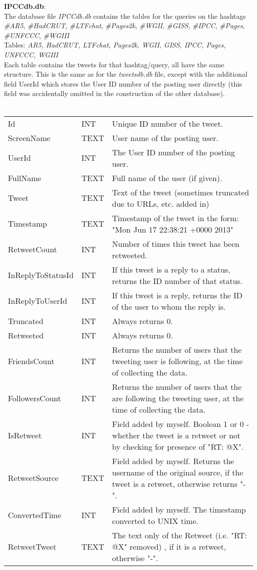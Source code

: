 \documentclass[paper=a4, fontsize=11pt]{scrartcl}
\numberwithin{equation}{section}		%
\numberwithin{figure}{section}			%
\numberwithin{table}{section}				%
\begin{document}
{\bf IPCCdb.db}:\\

The database file \emph{IPCCdb.db} contains the tables for the queries on the hashtags \emph{\#AR5}, \emph{\#HadCRUT}, \emph{\#LTFchat}, \emph{\#Pages2k},  \emph{\#WGII}, \emph{\#GISS}, \emph{\#IPCC}, \emph{\#Pages}, \emph{\#UNFCCC}, \emph{\#WGIII}\\

Tables: \emph{AR5, HadCRUT, LTFchat, Pages2k, WGII, GISS, IPCC, Pages, UNFCCC, WGIII}\\
Each table contains the tweets for that hashtag/query, all have the same structure. This is the same as for the \emph{tweetsdb.db} file, except with the additional field UserId which stores the User ID number of the posting user directly (this field was accidentally omitted in the construction of the other database).\\
\\
\begin{tabular}{l | l | p{13cm}} 
Id & INT & Unique ID number of the tweet. \\
ScreenName & TEXT & User name of the posting user. \\
UserId & INT & The User ID number of the posting user.\\
FullName & TEXT & Full name of the user (if given). \\
Tweet & TEXT & Text of the tweet (sometimes truncated due to URLs, etc. added in) \\
Timestamp & TEXT & Timestamp of the tweet in the form:  "Mon Jun 17 22:38:21 +0000 2013" \\
RetweetCount & INT & Number of times this tweet has been retweeted.\\
InReplyToStatusId & INT & If this tweet is a reply to a status, returns the ID number of that status. \\
InReplyToUserId & INT & If this tweet is a reply, returns the ID of the user to whom the reply is.\\
Truncated & INT & Always returns 0. \\
Retweeted & INT & Always returns 0. \\
FriendsCount & INT & Returns the number of users that the tweeting user is following, at the time of collecting the data.\\
FollowersCount & INT & Returns the number of users that the are following the tweeting user, at the time of collecting the data.\ \\
IsRetweet & INT & Field added by myself. Boolean 1 or 0 - whether the tweet is a retweet or not by checking for presence of "RT: @X".\\
RetweetSource & TEXT & Field added by myself. Returns the username of the original source, if the tweet is a retweet, otherwise returns "-". \\
ConvertedTime & INT & Field added by myself. The timestamp converted to UNIX time. \\
RetweetTweet & TEXT & The text only of the Retweet (i.e. "RT: @X" removed) , if it is a retweet, otherwise "-".\\
\end{tabular}\\
\\
\end{document}
